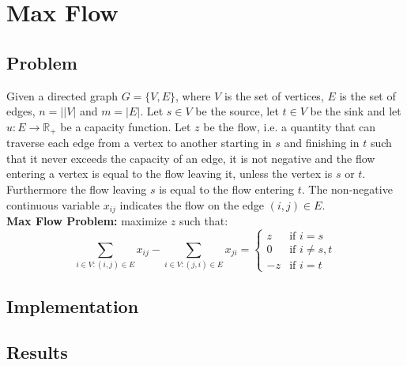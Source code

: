 \section{Max Flow}
\subsection{Problem}
Given a directed graph $G=\{V,E\}$, where $V$ is the set of vertices, $E$ is the set of edges, $n=||V|$ and $m=|E|$.
Let $s \in V$ be the source, let $t \in V$ be the sink and let $u: E \to \mathbb{R}_+$ be a capacity function.
Let $z$ be the flow, i.e. a quantity that can traverse each edge from a vertex to another starting in $s$ and finishing in $t$ such that it never exceeds the capacity of an edge,
it is not negative and the flow entering a vertex is equal to the flow leaving it, unless the vertex is $s$ or $t$. Furthermore the flow leaving $s$ is equal to the flow entering $t$.
The non-negative continuous variable $x_{ij}$ indicates the flow on the edge $(i,j)\in E$.
\vspace{1em}\\
\textbf{Max Flow Problem:} maximize $z$ such that:
\[
\sum_{i\in V:(i,j)\in E} x_{ij} - \sum_{i\in V:(j,i)\in E} x_{ji} =
\begin{cases}
    z & \text{if } i=s\\
    0 & \text{if } i\neq s,t\\
    -z & \text{if } i=t
\end{cases}
\]

\subsection{Implementation}

\subsection{Results}


